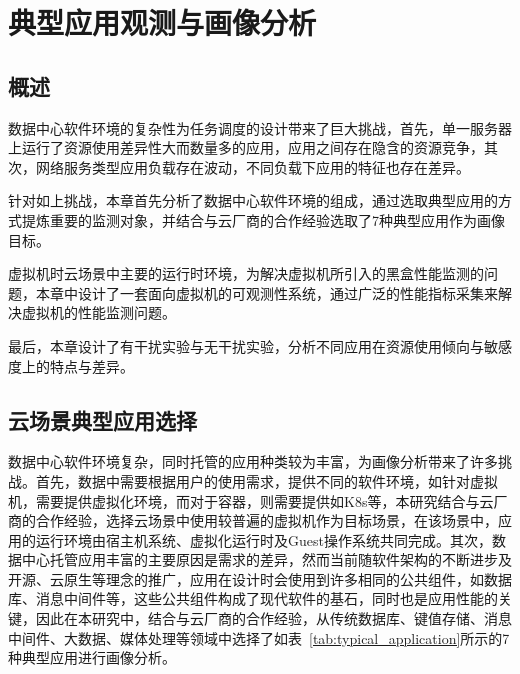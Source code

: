 \chapter{典型应用观测与画像分析}\label{chap:profiling}

\section{概述}

数据中心软件环境的复杂性为任务调度的设计带来了巨大挑战，首先，单一服务器上运行了资源使用差异性大而数量多的应用，应用之间存在隐含的资源竞争，其次，网络服务类型应用负载存在波动，不同负载下应用的特征也存在差异。

针对如上挑战，本章首先分析了数据中心软件环境的组成，通过选取典型应用的方式提炼重要的监测对象，并结合与云厂商的合作经验选取了7种典型应用作为画像目标。

虚拟机时云场景中主要的运行时环境，为解决虚拟机所引入的黑盒性能监测的问题，本章中设计了一套面向虚拟机的可观测性系统，通过广泛的性能指标采集来解决虚拟机的性能监测问题。

最后，本章设计了有干扰实验与无干扰实验，分析不同应用在资源使用倾向与敏感度上的特点与差异。

\section{云场景典型应用选择}


数据中心软件环境复杂，同时托管的应用种类较为丰富，为画像分析带来了许多挑战。首先，数据中需要根据用户的使用需求，提供不同的软件环境，如针对虚拟机，需要提供虚拟化环境，而对于容器，则需要提供如K8s等，本研究结合与云厂商的合作经验，选择云场景中使用较普遍的虚拟机作为目标场景，在该场景中，应用的运行环境由宿主机系统、虚拟化运行时及Guest操作系统共同完成。其次，数据中心托管应用丰富的主要原因是需求的差异，然而当前随软件架构的不断进步及开源、云原生等理念的推广，应用在设计时会使用到许多相同的公共组件，如数据库、消息中间件等，这些公共组件构成了现代软件的基石，同时也是应用性能的关键，因此在本研究中，结合与云厂商的合作经验，从传统数据库、键值存储、消息中间件、大数据、媒体处理等领域中选择了如表~\ref{tab:typical_application}所示的7种典型应用进行画像分析。

